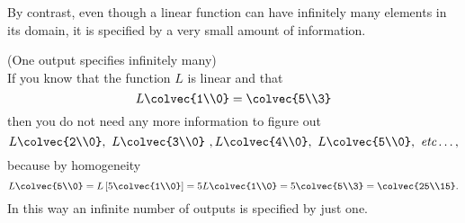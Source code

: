 By contrast, even though a linear function can have infinitely many elements in its domain, it is specified by a very small amount of information. 

\begin{example} (One output specifies infinitely many)\\ 
If you know that the function $L$ is linear and that 
\[L\colvec{1\\0}  =\colvec{5\\3}\] 
then you do not need any more information to figure out 
\[L\colvec{2\\0},~L\colvec{3\\0}~,L\colvec{4\\0},~L\colvec{5\\0} ,{\rm ~\mbox{\itshape etc}}\ldots, \] 
because by homogeneity
\[L\colvec{5\\0}=L\left[ 5\colvec{1\\0} \right] = 5 L\colvec{1\\0}=5\colvec{5\\3}=\colvec{25\\15}.\]
In this way an infinite number of outputs is specified by just one.
\end{example}


